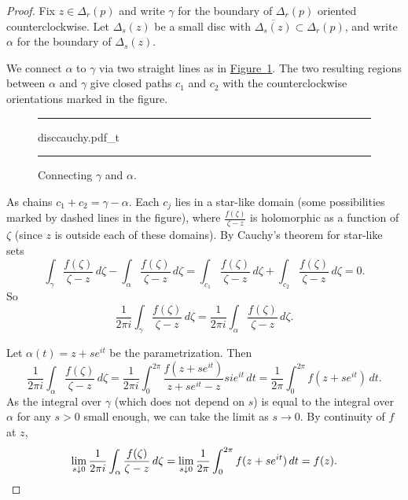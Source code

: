 \documentclass[12pt,openany]{book}
\theoremstyle{plain}
\theoremstyle{remark}
\theoremstyle{definition}
\newenvironment{myfig}{%
\begin{figure}[h!t]
\noindent\rule{\textwidth}{0.4pt}\vspace{12pt}\par\centering}%
{\par\noindent\rule{\textwidth}{0.4pt}
\end{figure}}
\theoremstyle{exercise}
\theoremstyle{example}
\newcommand{\figureref}[1]{\hyperref[#1]{Figure~\ref*{#1}}}
\begin{document}
\begin{proof}
Fix $z \in \Delta_r(p)$ and write
$\gamma$ for the boundary of $\Delta_r(p)$ oriented counterclockwise.
Let $\Delta_s(z)$ be a small disc with $\overline{\Delta_s(z)} \subset
\Delta_r(p)$, and write $\alpha$ for the boundary of $\Delta_s(z)$.

We connect $\alpha$ to $\gamma$
via two straight lines as in \figureref{fig:disccauchy}.
The two resulting regions between $\alpha$ and $\gamma$
give closed paths $c_1$ and $c_2$ with the counterclockwise
orientations marked in the figure.
\begin{myfig}
{disccauchy.pdf_t}
\caption{Connecting $\gamma$ and $\alpha$.%
\label{fig:disccauchy}}
\end{myfig}

As chains $c_1+c_2 = \gamma - \alpha$.  Each
$c_j$ lies in a star-like domain (some possibilities marked by dashed lines in the figure),
where $\frac{f(\zeta)}{\zeta-z}$ is holomorphic
as a function of $\zeta$ (since $z$ is outside each of these domains).
By Cauchy's theorem for star-like sets
\begin{equation*}
\int_{\gamma} \frac{f(\zeta)}{\zeta-z} \, d\zeta -
\int_{\alpha} \frac{f(\zeta)}{\zeta-z} \, d\zeta =
\int_{c_1} \frac{f(\zeta)}{\zeta-z} \, d\zeta + 
\int_{c_2} \frac{f(\zeta)}{\zeta-z} \, d\zeta = 0 .
\end{equation*}
So
\begin{equation*}
\frac{1}{2\pi i}
\int_{\gamma} \frac{f(\zeta)}{\zeta-z} \, d\zeta =
\frac{1}{2\pi i}
\int_{\alpha} \frac{f(\zeta)}{\zeta-z} \, d\zeta .
\end{equation*}

Let $\alpha(t) = z+s e^{i t}$ be the parametrization.
Then
\begin{equation*}
\frac{1}{2\pi i}
\int_{\alpha}
\frac{f(\zeta)}{\zeta-z}
\,
d \zeta
=
\frac{1}{2\pi i}
\int_0^{2\pi} \frac{f(z+se^{it})}{z + se^{it} - z} s i e^{it} \, dt
=
\frac{1}{2\pi}
\int_0^{2\pi} f(z+se^{it}) \, dt .
\end{equation*}
As the integral over $\gamma$ (which does not depend on $s$)
is equal to the integral over $\alpha$ for any $s > 0$ small enough,
we can take the limit as $s \to 0$.
By continuity of $f$ at $z$,
\begin{equation*}
\lim_{s \downarrow 0}
\frac{1}{2\pi i}
\int_{\alpha}
\frac{f(\zeta)}{\zeta-z}
\,
d \zeta
=
\lim_{s \downarrow 0}
\frac{1}{2\pi}
\int_0^{2\pi} f(z+se^{it}) \, dt
=
f(z) . \qedhere
\end{equation*}
\end{proof}
\end{document}
